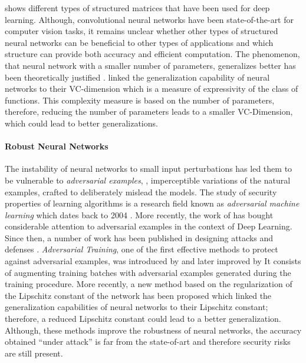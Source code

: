  shows different types of structured matrices that have been used for deep learning.
Although, convolutional neural networks have been state-of-the-art for computer vision tasks, it remains unclear whether other types of structured neural networks can be beneficial to other types of applications and which structure can provide both accuracy and efficient computation.
The phenomenon, that neural network with a smaller number of parameters, generalizes better has been theoretically justified \cite{vapnik1982estimation}.
\citeauthor{vapnik1982estimation} linked the generalization capability of neural networks to their VC-dimension which is a measure of expressivity of the class of functions.
This complexity measure is based on the number of parameters, therefore, reducing the number of parameters leads to a smaller VC-Dimension, which could lead to better generalizations.


\paragraph{Robust Neural Networks}
The instability of neural networks to small input perturbations has led them to be vulnerable to \emph{adversarial examples}, \ie, imperceptible variations of the natural examples, crafted to deliberately mislead the models.
The study of security properties of learning algorithms is a research field known as \emph{adversarial machine learning} which dates back to 2004 \cite{dalvi2004adversarial}.
More recently, the work of \citet{szegedy2013intriguing} has bought considerable attention to adversarial examples in the context of Deep Learning.
Since then, a number of work has been published in designing attacks and defenses \cite{szegedy2013intriguing,goodfellow2014explaining,papernot2016limitations,madry2018towards,carlini2017towards,pinot2019theoretical}.
\emph{Adversarial Training}, one of the first effective methods to protect against adversarial examples, was introduced by \citet{goodfellow2014explaining} and later improved by \citet{madry2018towards}
It consists of augmenting training batches with adversarial examples generated during the training procedure.
More recently, a new method \cite{farnia2018generalizable} based on the regularization of the Lipschitz constant of the network has been proposed which linked the generalization capabilities of neural networks to their Lipschitz constant; therefore, a reduced Lipschitz constant could lead to a better generalization.
Although, these methods improve the robustness of neural networks, the accuracy obtained ``under attack'' is far from the state-of-art and therefore security risks are still present. 




